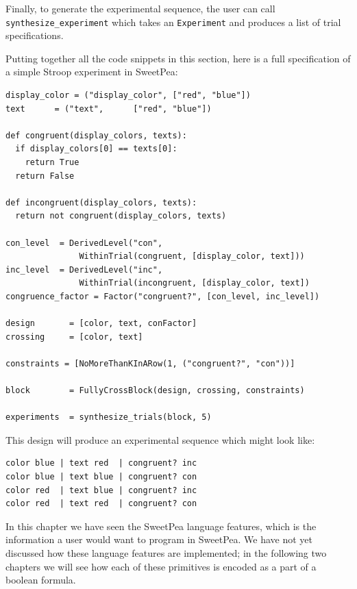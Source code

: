 Finally, to generate the experimental sequence, the user can call \texttt{synthesize\_experiment} which takes an \texttt{Experiment} and produces a list of trial specifications.

Putting together all the code snippets in this section, here is a full specification of a simple Stroop experiment in SweetPea:

\begin{verbatim}
display_color = ("display_color", ["red", "blue"])
text      = ("text",      ["red", "blue"])

def congruent(display_colors, texts):
  if display_colors[0] == texts[0]:
    return True
  return False

def incongruent(display_colors, texts):
  return not congruent(display_colors, texts)

con_level  = DerivedLevel("con",
               WithinTrial(congruent, [display_color, text]))
inc_level  = DerivedLevel("inc",
               WithinTrial(incongruent, [display_color, text])
congruence_factor = Factor("congruent?", [con_level, inc_level])

design       = [color, text, conFactor]
crossing     = [color, text]

constraints = [NoMoreThanKInARow(1, ("congruent?", "con"))]

block        = FullyCrossBlock(design, crossing, constraints)

experiments  = synthesize_trials(block, 5)
\end{verbatim}

This design will produce an experimental sequence which might look like:

\begin{verbatim}
color blue | text red  | congruent? inc
color blue | text blue | congruent? con
color red  | text blue | congruent? inc
color red  | text red  | congruent? con
\end{verbatim}


In this chapter we have seen the SweetPea language features, which is the information a user would want to program in SweetPea. We have not yet discussed how these language features are implemented; in the following two chapters we will see how each of these primitives is encoded as a part of a boolean formula.
